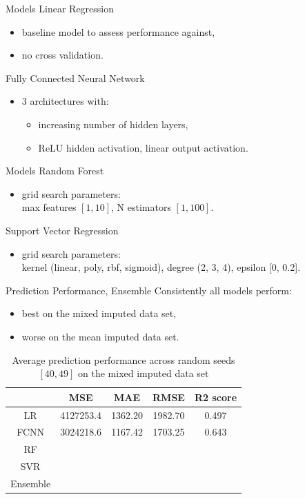 \documentclass{beamer} %
\begin{document}
\begin{frame}{Models}
  \vspace{-0.5cm}
  Linear Regression
  \begin{itemize}
      \item baseline model to assess performance against,
      \item no cross validation.
  \end{itemize}
  Fully Connected Neural Network
  \begin{itemize}
      \item 3 architectures with:
        \begin{itemize}
            \item increasing number of hidden layers,
            \item ReLU hidden activation, linear output activation.
        \end{itemize}
  \end{itemize}
\end{frame}

\begin{frame}{Models}
  \vspace{-0.5cm}
  Random Forest
  \begin{itemize}
      \item grid search parameters:\\
      max features $[1, 10]$, N estimators $[1, 100]$.
  \end{itemize}
  Support Vector Regression
  \begin{itemize}
      \item grid search parameters:\\
      kernel (linear, poly, rbf, sigmoid), degree (2, 3, 4), epsilon [0, 0.2].
  \end{itemize}
\end{frame}

\begin{frame}{Prediction Performance, Ensemble}
\vspace{-1cm}
 Consistently all models perform:
  \begin{itemize}
      \item best on the mixed imputed data set,
      \item worse on the mean imputed data set.
  \end{itemize}
  \begin{table}[ht!]
    \hspace{-0.7cm}
    \begin{tabular}{|c|c|c|c|c|}
        \hline
        & MSE & MAE & RMSE & R2 score\\
        \hline
        LR & 4127253.4 & 1362.20 & 1982.70 & 0.497 \\
        FCNN & 3024218.6 & 1167.42 & 1703.25 & 0.643 \\
        RF &  &  &  &  \\
        SVR &  &  &  &  \\
        Ensemble &  &  &  &  \\
        \hline
    \end{tabular}
    \caption{Average prediction performance across random seeds $[40, 49]$ on the mixed imputed data set}
    \label{tab:pred_perf}
\end{table}
\end{frame}
\end{document}
